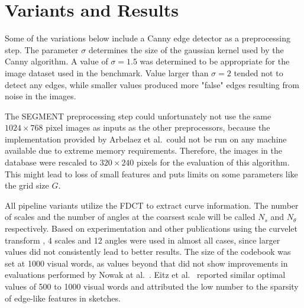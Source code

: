 \section{Variants and Results}\label{sec:results}

Some of the variations below include a Canny edge detector as a preprocessing
step. The parameter $\sigma$ determines the size of the gaussian kernel used by
the Canny algorithm. A value of $\sigma = 1.5$ was determined to be appropriate
for the image dataset used in the benchmark. Value larger than $\sigma = 2$
tended not to detect any edges, while smaller values produced more "false"
edges resulting from noise in the images.

The SEGMENT preprocessing step could unfortunately not use the same $1024
\times 768$ pixel images as inputs as the other preprocessors, because the
implementation provided by Arbelaez et al.\ could not be run on any machine
available due to extreme memory requirements. Therefore, the images in the
database were rescaled to $320 \times 240$ pixels for the evaluation of this
algorithm. This might lead to loss of small features and puts limits on some
parameters like the grid size $G$.

All pipeline variants utilize the FDCT to extract curve information. The number
of scales and the number of angles at the coarsest scale will be called $N_s$
and $N_{\theta}$ respectively. Based on experimentation and other publications
using the curvelet transform \autocite{mandal_curvelet_2009}
\autocite{guha_curvelet_????}, 4 scales and 12 angles were used in almost all
cases, since larger values did not consistently lead to better results. The
size of the codebook was set at 1000 visual words, as values beyond that did
not show improvements in evaluations performed by Nowak at al.\
\autocite{nowak_sampling_2006}. Eitz et al.\ \autocite{eitz_sketch-based_2010}
reported similar optimal values of 500 to 1000 visual words and attributed the
low number to the sparsity of edge-like features in sketches.



